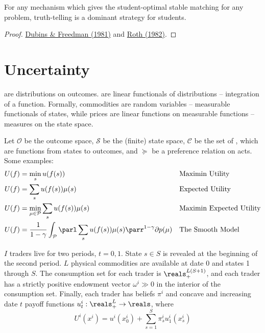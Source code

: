 \documentclass[10pt]{article}
\begin{document}
\begin{theorem}
	For any mechanism which gives the student-optimal stable matching for any problem, truth-telling is a dominant strategy for students.
\end{theorem}
\begin{proof}
	\href{https://www.jstor.org/stable/2321753?seq=1}{Dubins \& Freedman (1981)} and \href{https://wayback.archive-it.org/5456/20240920170030/http://www.eecs.harvard.edu/cs286r/courses/fall09/papers/roth.pdf}{Roth (1982)}.
\end{proof}

\section{Uncertainty}

\begin{definition}
	 are distributions on outcomes.  are linear functionals of distributions -- integration of a function. Formally, commodities are random variables -- measurable functionals of states, while prices are linear functions on measurable functions -- measures on the state space.
\end{definition}
\begin{model}
	 Let $\mathcal{O}$ be the outcome space, $\mathcal{S}$ be the (finite) state space, $\mathcal{C}$ be the set of , which are functions from states to outcomes, and $\succeq$ be a preference relation on acts. Some examples:
	\begin{align*}
		U(f) &= \min_s u(f(s)) &&\text{Maximin Utility} \\
		U(f) &= \sum_s u(f(s)) \mu(s) &&\text{Expected Utility} \\
		U(f) &= \min_{\mu \in \mathcal{P}}\sum_s u(f(s)) \mu(s) &&\text{Maximin Expected Utility} \\
		U(f) &= \frac{1}{1-\gamma} \int_\mathcal{P} \parl \sum_s u(f(s))\mu(s)\parr^{1-\gamma} \partial p(\mu) &&\text{The Smooth Model}
	\end{align*}
\end{model}

\begin{model}
	 $I$ traders live for two periods, $t = 0,1$. State $s \in S$ is revealed at the beginning of the second period. $L$ physical commodities are available at date 0 and states 1 through $S$. The consumption set for each trader is $\reals_+^{L(S+1)}$, and each trader has a strictly positive endowment vector $\omega^i \gg 0$ in the interior of the consumption set. Finally, each trader has beliefs $\pi^i$ and concave and increasing date $t$ payoff functions $u_t^i : \reals^L_+ \to \reals$, where \[U^i(x^i) = u^i(x^i_0) + \sum_{s=1}^S \pi_s^i u_1^i(x_s^i)\]
\end{model}
\end{document}
